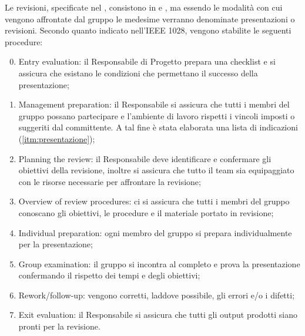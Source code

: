 Le revisioni, specificate nel \PianoDiProgetto, consistono in  e , ma essendo le modalit\`a con cui vengono affrontate dal gruppo le medesime verranno denominate presentazioni o revisioni. Secondo quanto indicato nell'IEEE 1028, vengono stabilite le seguenti procedure:
\begin{enumerate}
	\setcounter{enumi}{-1}
	\item Entry evaluation: il Responsabile di Progetto prepara una checklist e si assicura che esistano le condizioni che permettano il successo della presentazione;
	\item Management preparation: il Responsabile si assicura che tutti i membri del gruppo possano partecipare e l'ambiente di lavoro rispetti i vincoli imposti o suggeriti dal committente. A tal fine è stata elaborata una lista di indicazioni (\ref{itm:presentazione});
	\item Planning the review: il Responsabile deve identificare e confermare gli obiettivi della revisione, inoltre si assicura che tutto il team sia equipaggiato con le risorse necessarie per affrontare la revisione;
	\item Overview of review procedures: ci si assicura che tutti i membri del gruppo conoscano gli obiettivi, le procedure e il materiale portato in revisione;
	\item Individual preparation: ogni membro del gruppo si prepara individualmente per la presentazione;
	\item Group examination: il gruppo si incontra al completo e prova la presentazione confermando il rispetto dei tempi e degli obiettivi;
	\item Rework/follow-up: vengono corretti, laddove possibile,  gli errori e/o i difetti;
	\item Exit evaluation: il Responsabile si assicura che tutti gli output prodotti siano pronti per la revisione.
\end{enumerate}

